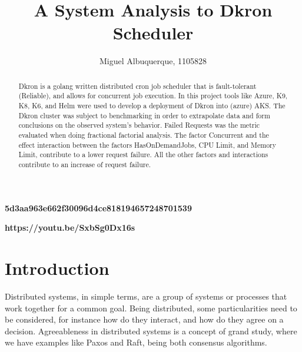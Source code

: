 \documentclass[runningheads]{llncs}
\begin{document}
%
\title{A System Analysis to Dkron Scheduler}


%
%
\author{Miguel Albuquerque, 1105828}
%
\maketitle              %
%
\begin{abstract}
Dkron is a golang written distributed cron job scheduler that is
fault-tolerant (Reliable), and allows for concurrent job execution.
In this project tools like Azure, K9, K8, K6, and Helm were used to develop a
deployment of Dkron into (azure) AKS. The Dkron cluster was subject to benchmarking
in order to extrapolate data and form conclusions on the observed system's behavior.
Failed Requests was the metric evaluated when doing fractional factorial analysis.
The factor Concurrent and the effect interaction between the factors HasOnDemandJobs,
CPU Limit, and Memory Limit, contribute to a lower request failure. All the other factors and interactions contribute
to an increase of request failure.
\end{abstract}

\par
{}
\par
{} \textbf{5d3aa963e662f30096d4ce818194657248701539}
\par
{} \textbf{https://youtu.be/SxbSg0Dx16s}



%
%
%


\section{Introduction}

Distributed systems, in simple terms, are a group of systems or processes that work together
for a common goal. Being distributed, some particularities need to be considered, for instance
how do they interact, and how do they agree on a decision. Agreeableness in distributed
systems is a concept of grand study, where we have examples like Paxos and Raft, being both
consensus algorithms.
\end{document}
